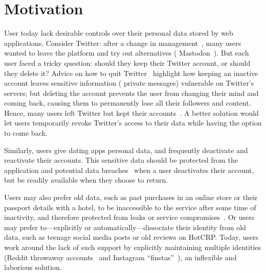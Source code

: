 \section{Motivation} 
User today lack desirable controls over their personal data stored by web
applications.
%
Consider Twitter: after a change in management~\cite{musk-twitter}, many users
wanted to leave the platform and try out alternatives (\eg
Mastodon~\cite{mastadon}).  But each user faced a tricky question: should they
keep their Twitter account, or should they delete it?
%
Advice on how to quit Twitter~\cite{quit-twitter-india, quit-twitter-mash}
highlight how keeping an inactive account leaves sensitive information (\eg
private messages) vulnerable on Twitter's servers; but deleting the account
prevents the user from changing their mind and coming back, causing them to
permanently lose all their followers and content.  Hence, many users left
Twitter but kept their accounts~\cite{nbc-twitter,shondarhimes,kenolin}.
%
A better solution would let users temporarily revoke Twitter's access to their
data while having the option to come back.

Similarly, users give dating apps personal data, and frequently deactivate and
reactivate their accounts.
%
This sensitive data should be protected from the application and potential data
breaches~\cite{tinder, okcupid} when a user deactivates their account, but be
readily available when they choose to return.

Users may also prefer old data, such as past purchases in an online store or
their passport details with a hotel, to be inaccessible to the service after
some time of inactivity, and therefore protected from leaks or service
compromises~\cite{retention,breach:marriott}. Or users may prefer
to---explicitly or automatically---dissociate their identity from old data, such
as teenage social media posts or old reviews on HotCRP.
%
Today, users work around the lack of such support by explicitly maintaining
multiple identities (\eg Reddit throwaway accounts~\cite{reddit:throwaway} and
Instagram ``finstas''~\cite{nytimes:finsta}), an inflexible and laborious
solution.
%

